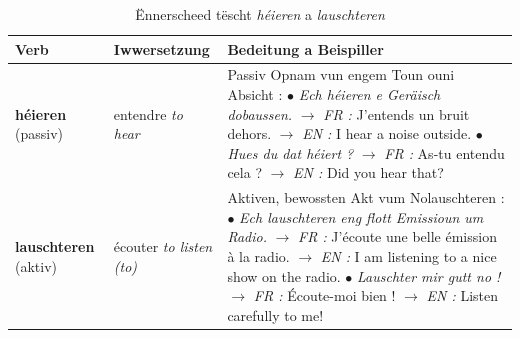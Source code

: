 \begin{table}[htbp]
    \centering
    \begin{tabular}{p{3.2cm}p{3.2cm}p{9.0cm}}
        \toprule
        \textbf{Verb} & \textbf{Iwwersetzung} & \textbf{Bedeitung a Beispiller} \\
        \midrule
        \textbf{héieren} \newline (passiv) & entendre \newline \textit{to hear} & Passiv Opnam vun engem Toun ouni Absicht : \newline $\bullet$ \textit{Ech héieren e Geräisch dobaussen.} \newline $\rightarrow$ \textit{FR :} J'entends un bruit dehors. \newline $\rightarrow$ \textit{EN :} I hear a noise outside. \newline $\bullet$ \textit{Hues du dat héiert ?} \newline $\rightarrow$ \textit{FR :} As-tu entendu cela ? \newline $\rightarrow$ \textit{EN :} Did you hear that? \\
        \midrule
        \textbf{lauschteren} \newline (aktiv) & écouter \newline \textit{to listen (to)} & Aktiven, bewossten Akt vum Nolauschteren : \newline $\bullet$ \textit{Ech lauschteren eng flott Emissioun um Radio.} \newline $\rightarrow$ \textit{FR :} J'écoute une belle émission à la radio. \newline $\rightarrow$ \textit{EN :} I am listening to a nice show on the radio. \newline $\bullet$ \textit{Lauschter mir gutt no !} \newline $\rightarrow$ \textit{FR :} Écoute-moi bien ! \newline $\rightarrow$ \textit{EN :} Listen carefully to me! \\
        \bottomrule
    \end{tabular}
    \caption{Ënnerscheed tëscht \textit{héieren} a \textit{lauschteren}}
\end{table}


